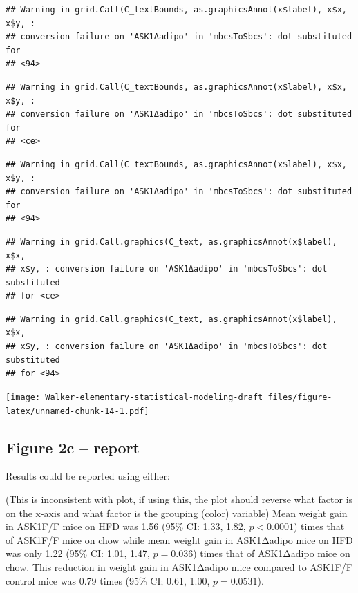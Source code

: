\documentclass[]{book}
\begin{document}
\begin{verbatim}
## Warning in grid.Call(C_textBounds, as.graphicsAnnot(x$label), x$x, x$y, :
## conversion failure on 'ASK1Δadipo' in 'mbcsToSbcs': dot substituted for
## <94>
\end{verbatim}

\begin{verbatim}
## Warning in grid.Call(C_textBounds, as.graphicsAnnot(x$label), x$x, x$y, :
## conversion failure on 'ASK1Δadipo' in 'mbcsToSbcs': dot substituted for
## <ce>
\end{verbatim}

\begin{verbatim}
## Warning in grid.Call(C_textBounds, as.graphicsAnnot(x$label), x$x, x$y, :
## conversion failure on 'ASK1Δadipo' in 'mbcsToSbcs': dot substituted for
## <94>
\end{verbatim}

\begin{verbatim}
## Warning in grid.Call.graphics(C_text, as.graphicsAnnot(x$label), x$x,
## x$y, : conversion failure on 'ASK1Δadipo' in 'mbcsToSbcs': dot substituted
## for <ce>
\end{verbatim}

\begin{verbatim}
## Warning in grid.Call.graphics(C_text, as.graphicsAnnot(x$label), x$x,
## x$y, : conversion failure on 'ASK1Δadipo' in 'mbcsToSbcs': dot substituted
## for <94>
\end{verbatim}

\texttt{[image: Walker-elementary-statistical-modeling-draft\_files/figure-latex/unnamed-chunk-14-1.pdf]}

\hypertarget{figure-2c-report}{%
\subsection{Figure 2c -- report}\label{figure-2c-report}}

Results could be reported using either:

(This is inconsistent with plot, if using this, the plot should reverse what factor is on the x-axis and what factor is the grouping (color) variable) Mean weight gain in ASK1F/F mice on HFD was 1.56 (95\% CI: 1.33, 1.82, \(p < 0.0001\)) times that of ASK1F/F mice on chow while mean weight gain in ASK1Δadipo mice on HFD was only 1.22 (95\% CI: 1.01, 1.47, \(p = 0.036\)) times that of ASK1Δadipo mice on chow. This reduction in weight gain in ASK1Δadipo mice compared to ASK1F/F control mice was 0.79 times (95\% CI; 0.61, 1.00, \(p = 0.0531\)).
\end{document}
